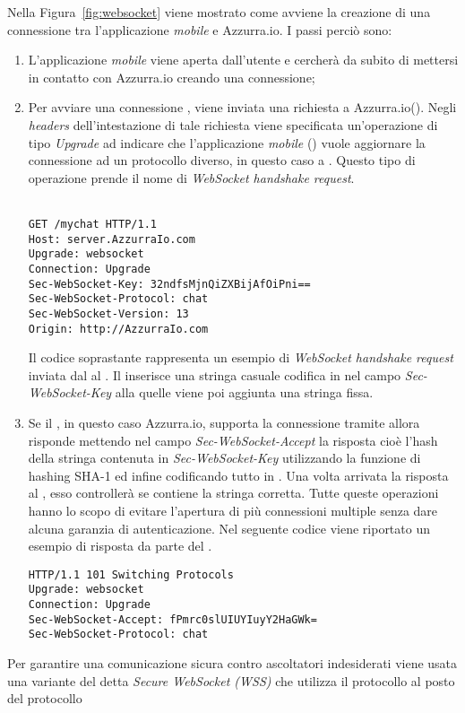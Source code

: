 Nella Figura~\ref{fig:websocket} viene mostrato come avviene la creazione di una connessione tra l'applicazione \emph{mobile} e Azzurra.io. I passi perciò sono:
\begin{enumerate}
	\item L'applicazione \emph{mobile} viene aperta dall'utente e cercherà da subito di mettersi in contatto con Azzurra.io creando una connessione;
	\item Per avviare una connessione , viene inviata una richiesta  a Azzurra.io(). Negli \emph{headers} dell’intestazione di tale richiesta viene specificata un'operazione di tipo \emph{Upgrade} ad indicare che l'applicazione \emph{mobile} () vuole aggiornare la connessione ad un protocollo diverso, in questo caso a . Questo tipo di operazione prende il nome di \emph{WebSocket handshake request}.\\
	\\
	\begin{lstlisting}
GET /mychat HTTP/1.1
Host: server.AzzurraIo.com
Upgrade: websocket	
Connection: Upgrade		
Sec-WebSocket-Key: 32ndfsMjnQiZXBijAfOiPni==
Sec-WebSocket-Protocol: chat		
Sec-WebSocket-Version: 13		
Origin: http://AzzurraIo.com
	\end{lstlisting}
	Il codice soprastante rappresenta un esempio di \emph{WebSocket handshake request} inviata dal  al . Il  inserisce una stringa casuale codifica in  nel campo \emph{Sec-WebSocket-Key} alla quelle viene poi aggiunta una stringa fissa.
	\item Se il , in questo caso Azzurra.io, supporta la connessione tramite  allora risponde mettendo nel campo \emph{Sec-WebSocket-Accept} la risposta cioè l'hash della stringa contenuta in \emph{Sec-WebSocket-Key} utilizzando la funzione di hashing SHA-1 ed infine codificando tutto in . Una volta arrivata la risposta al , esso controllerà se contiene la stringa corretta. Tutte queste operazioni hanno lo scopo di evitare l'apertura di più connessioni multiple senza dare alcuna garanzia di autenticazione.
	Nel seguente codice viene riportato un esempio di risposta da parte del .\\
	\begin{lstlisting}
HTTP/1.1 101 Switching Protocols
Upgrade: websocket
Connection: Upgrade
Sec-WebSocket-Accept: fPmrc0slUIUYIuyY2HaGWk=
Sec-WebSocket-Protocol: chat
	\end{lstlisting}
\end{enumerate}
Per garantire una comunicazione sicura contro ascoltatori indesiderati viene usata una variante del  detta \emph{Secure WebSocket (WSS)} che utilizza il protocollo  al posto del protocollo 
